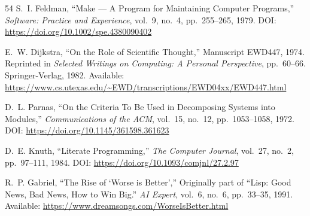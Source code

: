 \documentclass[acmlarge,nonacm,screen]{acmart}
\begin{document}
\begin{thebibliography}{54}
S.~I. Feldman,
``Make --- A Program for Maintaining Computer Programs,''
\textit{Software: Practice and Experience}, vol.~9, no.~4, pp.~255--265, 1979.
\newline DOI: \url{https://doi.org/10.1002/spe.4380090402}


E.~W. Dijkstra,
``On the Role of Scientific Thought,''
Manuscript EWD447, 1974. Reprinted in \textit{Selected Writings on Computing: A Personal Perspective}, pp.~60--66. Springer-Verlag, 1982.
\newline Available: \url{https://www.cs.utexas.edu/~EWD/transcriptions/EWD04xx/EWD447.html}

D.~L. Parnas,
``On the Criteria To Be Used in Decomposing Systems into Modules,''
\textit{Communications of the ACM}, vol.~15, no.~12, pp.~1053--1058, 1972.
\newline DOI: \url{https://doi.org/10.1145/361598.361623}


D.~E. Knuth,
``Literate Programming,''
\textit{The Computer Journal}, vol.~27, no.~2, pp.~97--111, 1984.
\newline DOI: \url{https://doi.org/10.1093/comjnl/27.2.97}


R.~P. Gabriel,
``The Rise of `Worse is Better',''
Originally part of ``Lisp: Good News, Bad News, How to Win Big.'' \textit{AI Expert}, vol.~6, no.~6, pp.~33--35, 1991.
\newline Available: \url{https://www.dreamsongs.com/WorseIsBetter.html}


\end{thebibliography}
\end{document}
